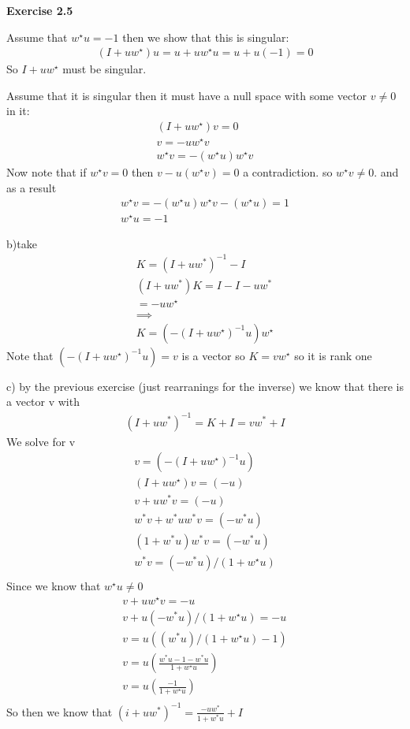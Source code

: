 \documentclass[12pt]{article}
\newenvironment{exercise}[1]{\vspace{.1in}\noindent\textbf{Exercise #1 \hspace{.05em}}}{}
\begin{document}
\begin{exercise}{2.5}

	Assume that $w^\star u=-1$ then we show that this is singular:
	\begin{align}
		(I+uw^\star)u=u+uw^\star u=u+u(-1)=0
	\end{align}
	So $I+uw^\star$ must be singular.

	Assume that it is singular then it must have a null space with some vector $v\neq 0$ in it:
	\begin{align}
		(I+uw^\star)v=0 \\
		v=-uw^{\star}v  \\
		w^\star v=-(w^\star u)w^{\star}v
	\end{align}
	Now note that if $w^\star v=0$ then $v-u(w^\star v)=0$ a contradiction. so $w^\star v\neq 0$. and as a result
	\begin{align}
		w^\star v=-(w^\star u)w^{\star}v
		-(w^\star u)=1 \\
		w^\star u = -1
	\end{align}

	b)take
	\begin{align}
		K=(I+uw^*)^{-1}-I  \\
		(I+uw^*)K=I-I-uw^* \\
		=-uw^\star         \\
		\implies           \\
		K=(-(I+uw^\star)^{-1}u)w^\star
	\end{align}
	Note that $(-(I+uw^\star)^{-1}u)=v$ is a vector so $K=vw^\star$ so it is rank one

	c) by the previous exercise (just rearranings for the inverse) we know that there is a vector v with
	\begin{align}
		(I+uw^*)^{-1}=K+I=vw^*+I
	\end{align}
	We solve for v
	\begin{align}
		v=(-(I+uw^\star)^{-1}u)       \\
		(I+uw^\star)v=(-u)            \\
		v+uw^*v=(-u)                  \\
		w^{*}v+w^*uw^*v=(-w^*u)       \\
		(1+w^{*}u)w^{*}v=(-w^*u)      \\
		w^{*}v=(-w^*u)/(1+w^{\star}u) \\
	\end{align}
	Since we know that $w^\star u\neq 0$
	\begin{align}
		v+uw^\star v=-u                       \\
		v+u(-w^*u)/(1+w^{\star}u)=-u          \\
		v=u((w^*u)/(1+w^{\star}u)-1)          \\
		v=u(\frac{w^*u-1-w^*u}{1+w^{\star}u}) \\
		v=u(\frac{-1}{1+w^{\star}u})          \\
	\end{align}
	So then we know that $(i+uw^*)^{-1}=\frac{-uw^*}{1+w^*u}+I$


\end{exercise}
\end{document}
